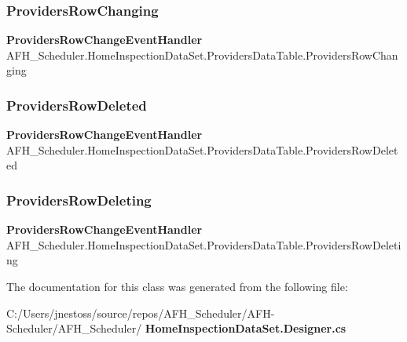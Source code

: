 \subsubsection{ProvidersRowChanging}
{\footnotesize\ttfamily \textbf{ Providers\+Row\+Change\+Event\+Handler} A\+F\+H\+\_\+\+Scheduler.\+Home\+Inspection\+Data\+Set.\+Providers\+Data\+Table.\+Providers\+Row\+Changing}

\mbox{\label{class_a_f_h___scheduler_1_1_home_inspection_data_set_1_1_providers_data_table_a46f388bdc2f81ac5025dacc353b999d5}} 
\subsubsection{ProvidersRowDeleted}
{\footnotesize\ttfamily \textbf{ Providers\+Row\+Change\+Event\+Handler} A\+F\+H\+\_\+\+Scheduler.\+Home\+Inspection\+Data\+Set.\+Providers\+Data\+Table.\+Providers\+Row\+Deleted}

\mbox{\label{class_a_f_h___scheduler_1_1_home_inspection_data_set_1_1_providers_data_table_a3d8ebe4a49262c850d63734cefe16fb5}} 
\subsubsection{ProvidersRowDeleting}
{\footnotesize\ttfamily \textbf{ Providers\+Row\+Change\+Event\+Handler} A\+F\+H\+\_\+\+Scheduler.\+Home\+Inspection\+Data\+Set.\+Providers\+Data\+Table.\+Providers\+Row\+Deleting}



The documentation for this class was generated from the following file\+:\begin{DoxyCompactItemize}
\item 
C\+:/\+Users/jnestoss/source/repos/\+A\+F\+H\+\_\+\+Scheduler/\+A\+F\+H-\/\+Scheduler/\+A\+F\+H\+\_\+\+Scheduler/\textbf{ Home\+Inspection\+Data\+Set.\+Designer.\+cs}\end{DoxyCompactItemize}
